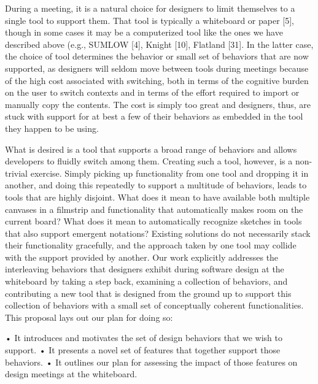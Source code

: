 During a meeting, it is a natural choice for designers to limit themselves to a single tool to support them. That tool is typically a whiteboard or paper [5], though in some cases it may be a computerized tool like the ones we have described above (e.g., SUMLOW [4], Knight [10], Flatland [31]. In the latter case, the choice of tool determines the behavior or small set of behaviors that are now supported, as designers will seldom move between tools during meetings because of the high cost associated with switching, both in terms of the cognitive burden on the user to switch contexts and in terms of the effort required to import or manually copy the contents. The cost is simply too great and designers, thus, are stuck with support for at best a few of their behaviors as embedded in the tool they happen to be using.

What is desired is a tool that supports a broad range of behaviors and allows developers to fluidly switch among them. Creating such a tool, however, is a non-trivial exercise. Simply picking up functionality from one tool and dropping it in another, and doing this repeatedly to support a multitude of behaviors, leads to tools that are highly disjoint. What does it mean to have available both multiple canvases in a filmstrip and functionality that automatically makes room on the current board?  What does it mean to automatically recognize sketches in tools that also support emergent notations? Existing solutions do not necessarily stack their functionality gracefully, and the approach taken by one tool may collide with the support provided by another.
Our work explicitly addresses the interleaving behaviors that designers exhibit during software design at the whiteboard by taking a step back, examining a collection of behaviors, and contributing a new tool that is designed from the ground up to support this collection of behaviors with a small set of conceptually coherent functionalities.  This proposal lays out our plan for doing so:

•	It introduces and motivates the set of design behaviors that we wish to support.
•	It presents a novel set of features that together support those behaviors.
•	It outlines our plan for assessing the impact of those features on design meetings at the whiteboard. 



